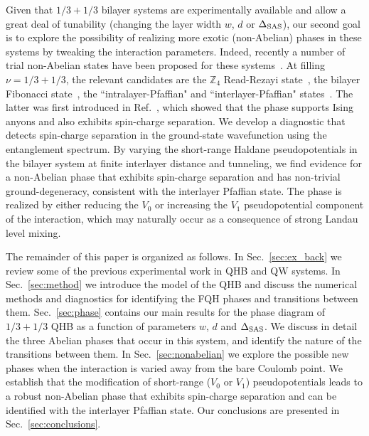 Given that $1/3+1/3$ bilayer systems are experimentally available and allow a great deal of tunability (changing the layer width $w$, $d$ or $\Delta_\textrm{SAS}$), our second goal is to explore the possibility of realizing more exotic (non-Abelian) phases in these systems by tweaking the interaction parameters. 
Indeed, recently a number of trial non-Abelian states have been proposed for these systems~\cite{Ardonne02, Barkeshli10, RezayiZ4, BondersonSlingerland, Barkeshli11, Barkeshli14, Vaezi14}.
At filling $\nu=1/3+1/3$, the relevant candidates are the $\mathbb{Z}_4$ Read-Rezayi state~\cite{Read-PhysRevB.59.8084}, the bilayer Fibonacci state~\cite{Vaezi14}, the ``intralayer-Pfaffian" and ``interlayer-Pfaffian" states~\cite{Barkeshli10}. 
The latter was first introduced in Ref.~\cite{Ardonne02}, which showed that the phase supports Ising anyons and also exhibits spin-charge separation.
We develop a diagnostic that detects spin-charge separation in the ground-state wavefunction using the entanglement spectrum. 
By varying the short-range Haldane pseudopotentials in the bilayer system at finite interlayer distance and tunneling, we find evidence for a non-Abelian phase that exhibits spin-charge separation and has non-trivial ground-degeneracy, consistent with the interlayer Pfaffian state. 
The phase is realized by either reducing the $V_0$ or increasing the $V_1$ pseudopotential component of the interaction, which may naturally occur as a consequence of strong Landau level mixing.    

The remainder of this paper is organized as follows.
In Sec.~\ref{sec:ex_back} we review some of the previous experimental work in QHB and QW systems.
In Sec.~\ref{sec:method} we introduce the model of the QHB and discuss the numerical methods and diagnostics for identifying the FQH phases and transitions between them. 
Sec.~\ref{sec:phase} contains our main results for the phase diagram of $1/3+1/3$ QHB as a function of parameters $w$, $d$ and $\Delta_\textrm{SAS}$. 
We discuss in detail the three Abelian phases that occur in this system, and identify the nature of the transitions between them. 
In Sec.~\ref{sec:nonabelian} we explore the possible new phases when the interaction is varied away from the bare Coulomb point. 
We establish that the modification of short-range ($V_0$ or $V_1$) pseudopotentials leads to a robust non-Abelian phase that exhibits spin-charge separation and can be identified with the interlayer Pfaffian state.
Our conclusions are presented in Sec.~\ref{sec:conclusions}.

